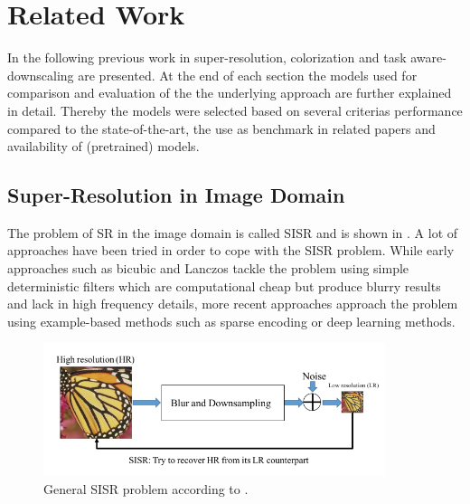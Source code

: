 \newpage
\section{Related Work}
\label{sec:RelatedWork}
In the following previous work in super-resolution, colorization and
task aware-downscaling are presented. At the end of each section the models
used for comparison and evaluation of the the underlying approach are further
explained in detail. Thereby the models were selected based on several criterias
performance compared to the state-of-the-art, the use as benchmark in related
papers and availability of (pretrained) models.

\subsection{Super-Resolution in Image Domain}
The problem of SR in the image domain is called \ac{SISR} and is shown in
. A lot of approaches have been
tried in order to cope with the \ac{SISR} problem. While early approaches such as
bicubic and Lanczos \cite{LFIOATD} tackle the problem using simple deterministic
filters which are computational cheap but produce blurry results and lack in
high frequency details, more recent approaches approach the problem using
example-based methods such as sparse encoding or deep learning methods.

\begin{figure}[!htbp]
	\centering
	\includegraphics[width=10cm]{figures/sisr_problem}
	\caption{General SISR problem  according to \cite{DLFSISRABR}.}
  \label{fig:sisr_problem}
\end{figure}

